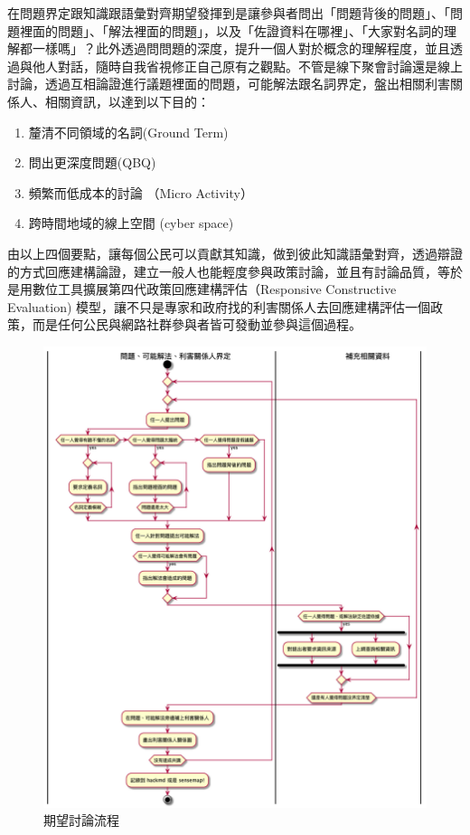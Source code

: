 \documentclass[12pt,a4paper]{article}
\begin{document}
在問題界定跟知識跟語彙對齊期望發揮到是讓參與者問出「問題背後的問題」、「問題裡面的問題」、「解法裡面的問題」，以及「佐證資料在哪裡」、「大家對名詞的理解都一樣嗎」？此外透過問問題的深度，提升一個人對於概念的理解程度，並且透過與他人對話，隨時自我省視修正自己原有之觀點。不管是線下聚會討論還是線上討論，透過互相論證進行議題裡面的問題，可能解法跟名詞界定，盤出相關利害關係人、相關資訊，以達到以下目的：

\begin{enumerate}
\item 釐清不同領域的名詞(Ground Term)
\item 問出更深度問題(QBQ)
\item 頻繁而低成本的討論 （Micro Activity）
\item 跨時間地域的線上空間 (cyber space)
\end{enumerate}

由以上四個要點，讓每個公民可以貢獻其知識，做到彼此知識語彙對齊，透過辯證的方式回應建構論證，建立一般人也能輕度參與政策討論，並且有討論品質，等於是用數位工具擴展第四代政策回應建構評估（Responsive Constructive Evaluation) \citep{guba01} 模型，讓不只是專家和政府找的利害關係人去回應建構評估一個政策，而是任何公民與網路社群參與者皆可發動並參與這個過程。

\begin{figure}[htbp]
\centering
\includegraphics[width=.9\linewidth]{./images/problem_idenity_flow.png}
\caption{\label{fig:problem_idenity_flow}
期望討論流程}
\end{figure}
\end{document}
